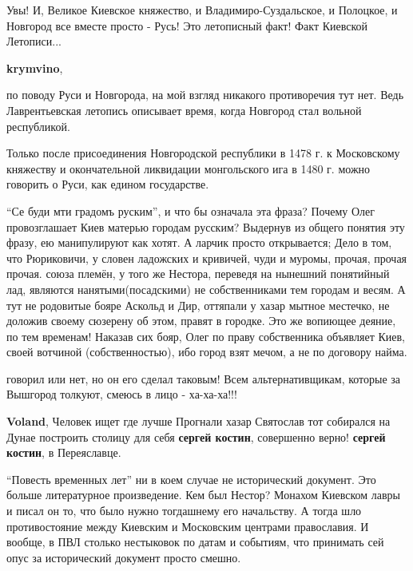 \begin{itemize}
\begin{itemize}
Увы! И, Великое Киевское княжество, и Владимиро-Суздальское, и Полоцкое, и
Новгород все вместе просто - Русь! Это летописный факт! Факт Киевской
Летописи...

\textbf{krymvino}, 

по поводу Руси и Новгорода, на мой взгляд никакого противоречия тут нет. Ведь
Лаврентьевская летопись описывает время, когда Новгород стал вольной
республикой.

Только после присоединения Новгородской республики в 1478 г. к Московскому
княжеству и окончательной ликвидации монгольского ига в 1480 г. можно говорить
о Руси, как едином государстве.

\end{itemize} %


\enquote{Се буди мти градомъ руским}, и что бы означала эта фраза? Почему Олег
провозглашает Киев матерью городам русским? Выдернув из общего понятия эту
фразу, ею манипулируют как хотят. А ларчик просто открывается; Дело в том, что
Рюриковичи, у словен ладожских и кривичей, чуди и муромы, прочая, прочая прочая.
союза племён, у того же Нестора, переведя на нынешний понятийный лад, являются
нанятыми(посадскими) не собственниками тем городам и весям. А тут не родовитые
бояре Аскольд и Дир, оттяпали у хазар мытное местечко, не доложив своему
сюзерену об этом, правят в городке. Это же вопиющее деяние, по тем временам!
Наказав сих бояр, Олег по праву собственника объявляет Киев, своей вотчиной
(собственностью), ибо город взят мечом, а не по договору найма.


говорил или нет, но он его сделал таковым! Всем альтернативщикам, которые за
Вышгород толкуют, смеюсь в лицо - ха-ха-ха!!!

\begin{itemize} %
\textbf{Voland}, Человек ищет где лучше Прогнали хазар Святослав тот собирался на Дунае построить столицу для себя
\textbf{сергей костин}, совершенно верно!
\textbf{сергей костин}, в Переяславце.
\end{itemize} %


\enquote{Повесть временных лет} ни в коем случае не исторический документ. Это больше
литературное произведение. Кем был Нестор? Монахом Киевском лавры и писал он
то, что было нужно тогдашнему его начальству. А тогда шло противостояние между
Киевским и Московским центрами православия. И вообще, в ПВЛ столько нестыковок
по датам и событиям, что принимать сей опус за исторический документ просто
смешно.


\end{itemize}
